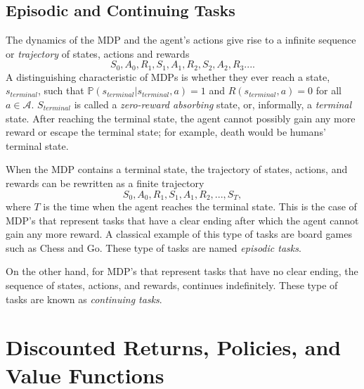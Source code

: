 \subsection{Episodic and Continuing Tasks}

The dynamics of the MDP and the agent's actions give rise to a infinite sequence or \textit{trajectory} of states, actions and rewards
\begin{equation*}
S_0, A_0, R_1, S_1, A_1, R_2, S_2, A_2, R_3 ....
\end{equation*}
A distinguishing characteristic of MDPs is whether they ever reach a state, $s_{terminal}$, such that $\mathbb{P}(s_{terminal} | s_{terminal}, a) = 1$ and $R(s_{terminal}, a) = 0$ for all $a \in \mathcal{A}$. $S_{terminal}$ is called a \textit{zero-reward absorbing} state, or, informally, a \textit{terminal} state.
After reaching the terminal state, the agent cannot possibly gain any more reward or escape the terminal state; for example, death would be humans' terminal state.

When the MDP contains a terminal state, the trajectory of states, actions, and rewards can be rewritten as a finite trajectory
\begin{equation*}
S_0, A_0, R_1, S_1, A_1, R_2, ..., S_T,
\end{equation*}
where $T$ is the time when the agent reaches the terminal state. This is the case of MDP's that represent tasks that have a clear ending after which the agent cannot gain any more reward. A classical example of this type of tasks are board games such as Chess and Go. These type of tasks are named \textit{episodic tasks}.

On the other hand, for MDP's that represent tasks that have no clear ending, the sequence of states, actions, and rewards, continues indefinitely. These type of tasks are known as \textit{continuing tasks}.

\section{Discounted Returns, Policies, and Value Functions}

